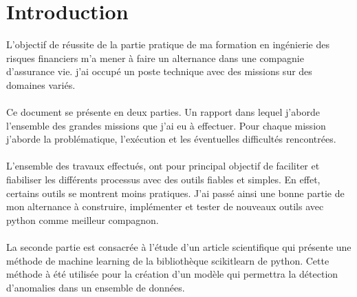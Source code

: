 \chapter*{Introduction}
L'objectif de réussite de la partie pratique de ma formation en ingénierie des risques financiers m'a mener à faire un alternance dans une compagnie d'assurance vie. j'ai occupé un poste technique avec des missions sur des domaines variés.
\\
\\
Ce document se présente en deux parties. Un rapport dans lequel j'aborde l'ensemble des grandes missions que j'ai eu à effectuer. Pour chaque mission j'aborde la problématique, l'exécution et les éventuelles difficultés rencontrées.
\\
\\
L'ensemble des travaux effectués, ont pour principal objectif de faciliter et fiabiliser les différents processus avec des outils fiables et simples. En effet, certains outils se montrent moins pratiques. J'ai passé ainsi une bonne partie de mon alternance à construire, implémenter et tester de nouveaux outils avec python comme meilleur compagnon.
\\
\\
La seconde partie est consacrée à l'étude d'un article scientifique qui présente une méthode de machine learning de la bibliothèque scikitlearn de python. Cette méthode à été utilisée pour la création d'un modèle qui permettra la détection d'anomalies dans un ensemble de données.



